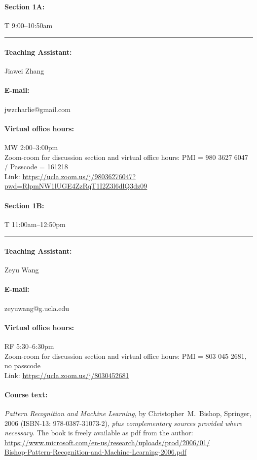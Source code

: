 \documentclass[11pt,letter]{article}
\begin{document}

\paragraph{Section 1A: } T 9:00--10:50am\phantom{p}\hrule
\paragraph{Teaching Assistant:} Jiawei Zhang
\paragraph{E-mail:} jwzcharlie@gmail.com
\paragraph{Virtual office hours:} MW 2:00--3:00pm \\
Zoom-room for discussion section and virtual office hours: PMI = 980 3627 6047  / Passcode = 161218\\
Link: \url{https://ucla.zoom.us/j/98036276047?pwd=RlpmNW1lUGE4ZzRqT1I2Z3l6dlQ3dz09}

\paragraph{Section 1B: } T 11:00am--12:50pm\hrule
\paragraph{Teaching Assistant:}   Zeyu Wang
\paragraph{E-mail:} zeyuwang@g.ucla.edu
\paragraph{Virtual office hours:} RF 5:30--6:30pm\\
Zoom-room for discussion section and virtual office hours:  PMI = 803 045 2681, no passcode\\
Link: \url{https://ucla.zoom.us/j/8030452681}



\paragraph{Course text:} \emph{Pattern Recognition and Machine Learning}, by Christopher~M.~Bishop, Springer, 2006 (ISBN-13: 978-0387-31073-2),
\emph{plus complementary sources provided where necessary}. The book is freely available as pdf from the author:\\
\url{https://www.microsoft.com/en-us/research/uploads/prod/2006/01/}\\\url{Bishop-Pattern-Recognition-and-Machine-Learning-2006.pdf}
\end{document}
